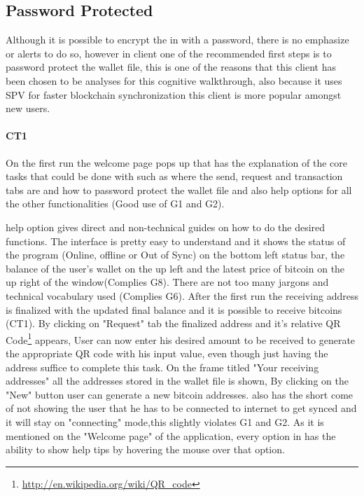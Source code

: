 
\subsection{Password Protected}
Although it is possible to encrypt the \walletfile in \bitcoinclient with a password, there is no emphasize or alerts to do so, however in \multibit client one of the recommended first steps is to password protect the wallet file, this is one of the reasons that this client has been chosen to be analyses for this cognitive walkthrough, also because it uses SPV for faster blockchain synchronization this client is more popular amongst new users.

\paragraph{CT1}On the first run the welcome page pops up that has the explanation of the core tasks that could be done with \multibit such as where the send, request and transaction tabs are and how to password protect the wallet file and also help options for all the other functionalities (Good use of G1 and G2). 

\multibit help option gives direct and non-technical guides on how to do the desired functions. The interface is pretty easy to understand and it shows the status of the program (Online, offline or Out of Sync) on the bottom left  status bar, the balance of the user's wallet on the up left and the latest price of bitcoin on the up right of the window(Complies G8). There are not too many jargons and technical vocabulary used (Complies G6). After the first run the receiving address is finalized with the updated final balance and it is possible to receive bitcoins (CT1). By clicking on "Request" tab the finalized address and it's relative QR Code\footnote{\url{http://en.wikipedia.org/wiki/QR_code}} appears, User can now enter his desired amount to be received to generate the appropriate QR code with his input value, even though just having the address suffice to complete this task. On the frame titled "Your receiving addresses" all the addresses stored in the wallet file is shown, By clicking on the "New" button user can generate a new bitcoin addresses. \multibit also has the short come of not showing the user that he has to be connected to internet to get synced and it will stay on "connecting" mode,this slightly violates G1 and G2.
As it is mentioned on the "Welcome page" of the application, every option in \multibit has the ability to show help tips by hovering the mouse over that option.

